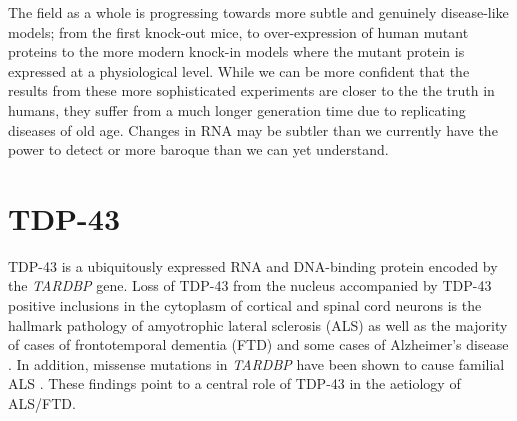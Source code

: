 The field as a whole is progressing towards more subtle and genuinely disease-like models; from the first knock-out mice, to over-expression of human mutant proteins to the more modern knock-in models where the mutant protein is expressed at a physiological level. While we can be more confident that the results from these more sophisticated experiments are closer to the the truth in humans, they suffer from a much longer generation time due to replicating diseases of old age. Changes in RNA may be subtler than we currently have the power to detect or more baroque than we can yet understand. 

%




%
%
%
%
%
%
%


\section{TDP-43}
TDP-43 is a ubiquitously expressed RNA and DNA-binding protein encoded by the \emph{TARDBP} gene. Loss of TDP-43 from the nucleus accompanied by TDP-43 positive inclusions in the cytoplasm of cortical and spinal cord neurons is the hallmark pathology of amyotrophic lateral sclerosis (ALS) as well as the majority of  cases of frontotemporal dementia (FTD) \citep{Neumann2006-re} and some cases of Alzheimer's disease \citep{LaClair2016} . In addition, missense mutations in \emph{TARDBP} have been shown to cause familial ALS \citep{Sreedharan2008-xv}. These findings point to a central role of TDP-43 in the aetiology of ALS/FTD. 


